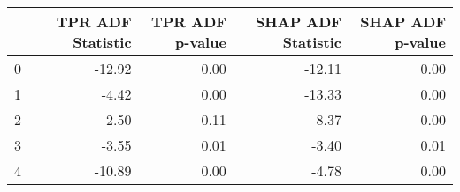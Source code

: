 \begin{tabular}{lrrrr}
\toprule
 & TPR ADF Statistic & TPR ADF p-value & SHAP ADF Statistic & SHAP ADF p-value \\
\midrule
0 & -12.92 & 0.00 & -12.11 & 0.00 \\
1 & -4.42 & 0.00 & -13.33 & 0.00 \\
2 & -2.50 & 0.11 & -8.37 & 0.00 \\
3 & -3.55 & 0.01 & -3.40 & 0.01 \\
4 & -10.89 & 0.00 & -4.78 & 0.00 \\
\bottomrule
\end{tabular}
